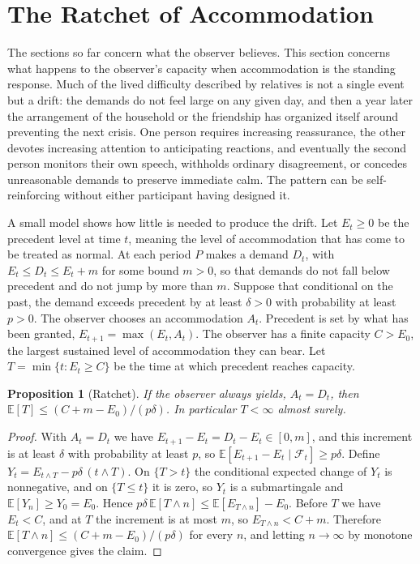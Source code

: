 \documentclass[11pt]{article}
\newtheorem{proposition}{Proposition}
\theoremstyle{definition}
\theoremstyle{remark}
\begin{document}
\section{The Ratchet of Accommodation}\label{sec:ratchet}

The sections so far concern what the observer believes. This section concerns what happens to the observer's capacity when accommodation is the standing response. Much of the lived difficulty described by relatives is not a single event but a drift: the demands do not feel large on any given day, and then a year later the arrangement of the household or the friendship has organized itself around preventing the next crisis. One person requires increasing reassurance, the other devotes increasing attention to anticipating reactions, and eventually the second person monitors their own speech, withholds ordinary disagreement, or concedes unreasonable demands to preserve immediate calm. The pattern can be self-reinforcing without either participant having designed it.

A small model shows how little is needed to produce the drift. Let $E_t\ge0$ be the precedent level at time $t$, meaning the level of accommodation that has come to be treated as normal. At each period $P$ makes a demand $D_t$, with $E_t\le D_t\le E_t+m$ for some bound $m>0$, so that demands do not fall below precedent and do not jump by more than $m$. Suppose that conditional on the past, the demand exceeds precedent by at least $\delta>0$ with probability at least $p>0$. The observer chooses an accommodation $A_t$. Precedent is set by what has been granted, $E_{t+1}=\max(E_t,A_t)$. The observer has a finite capacity $C>E_0$, the largest sustained level of accommodation they can bear. Let $T=\min\{t:E_t\ge C\}$ be the time at which precedent reaches capacity.

\begin{proposition}[Ratchet]\label{prop:ratchet}
If the observer always yields, $A_t=D_t$, then $\mathbb{E}[T]\le (C+m-E_0)/(p\delta)$. In particular $T<\infty$ almost surely.
\end{proposition}

\begin{proof}
With $A_t=D_t$ we have $E_{t+1}-E_t=D_t-E_t\in[0,m]$, and this increment is at least $\delta$ with probability at least $p$, so $\mathbb{E}[E_{t+1}-E_t\mid\mathcal{F}_t]\ge p\delta$. Define $Y_t=E_{t\wedge T}-p\delta\,(t\wedge T)$. On $\{T>t\}$ the conditional expected change of $Y_t$ is nonnegative, and on $\{T\le t\}$ it is zero, so $Y_t$ is a submartingale and $\mathbb{E}[Y_n]\ge Y_0=E_0$. Hence $p\delta\,\mathbb{E}[T\wedge n]\le\mathbb{E}[E_{T\wedge n}]-E_0$. Before $T$ we have $E_t<C$, and at $T$ the increment is at most $m$, so $E_{T\wedge n}<C+m$. Therefore $\mathbb{E}[T\wedge n]\le(C+m-E_0)/(p\delta)$ for every $n$, and letting $n\to\infty$ by monotone convergence gives the claim.
\end{proof}
\end{document}
